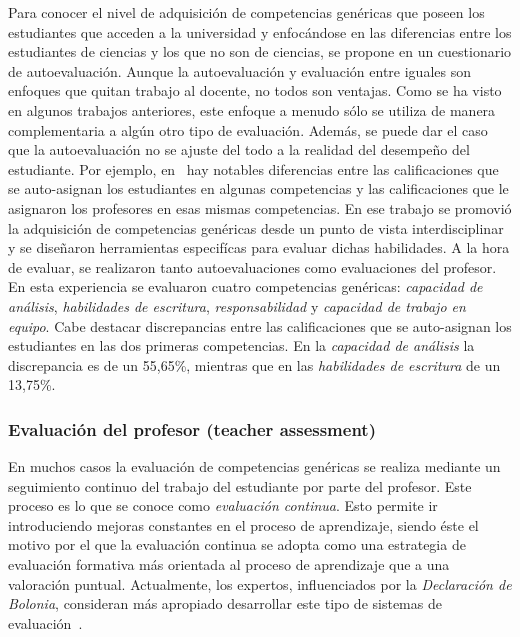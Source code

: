 Para conocer el nivel de adquisición de competencias genéricas que poseen los estudiantes que acceden a la universidad y enfocándose en las diferencias entre los estudiantes de ciencias y los que no son de ciencias, se propone en \cite{so2011mapping} un cuestionario de autoevaluación. Aunque la autoevaluación y evaluación entre iguales son enfoques que quitan trabajo al docente, no todos son ventajas. Como se ha visto en algunos trabajos anteriores, este enfoque a menudo sólo se utiliza de manera complementaria a algún otro tipo de evaluación. Además, se puede dar el caso que la autoevaluación no se ajuste del todo a la realidad del desempeño del estudiante. Por ejemplo, en~\cite{carreras2013promotion} hay notables diferencias entre las calificaciones que se auto-asignan los estudiantes en algunas competencias y las calificaciones que le asignaron los profesores en esas mismas competencias. En ese trabajo se promovió la adquisición de competencias genéricas desde un punto de vista interdisciplinar y se diseñaron herramientas especifícas para evaluar dichas habilidades. A la hora de evaluar, se realizaron tanto autoevaluaciones como evaluaciones del profesor. En esta experiencia se evaluaron cuatro competencias genéricas: \emph{capacidad de análisis},  \emph{habilidades de escritura}, \emph{responsabilidad} y \emph{capacidad de trabajo en equipo}. Cabe destacar discrepancias entre las calificaciones que se auto-asignan los estudiantes en las dos primeras competencias. En la \emph{capacidad de análisis} la discrepancia es de un 55,65\%, mientras que en las \emph{habilidades de escritura} de un 13,75\%.



\subsubsection{Evaluación del profesor (teacher assessment)}

En muchos casos la evaluación de competencias genéricas se realiza mediante un seguimiento continuo del trabajo del estudiante por parte del profesor. Este proceso es lo que se conoce como \emph{evaluación continua}. Esto permite ir introduciendo mejoras constantes en el proceso de aprendizaje, siendo éste el motivo por el que la evaluación continua se adopta como una estrategia de evaluación formativa más orientada al proceso de aprendizaje que a una valoración puntual. Actualmente, los expertos, influenciados por la \emph{Declaración de Bolonia}, consideran más apropiado desarrollar este tipo de sistemas de evaluación~\cite{garcia2005competencias}. 

